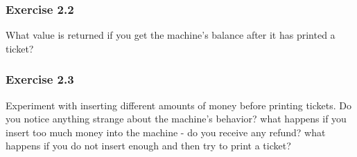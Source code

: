 \subsubsection{Exercise 2.2}
What value is returned if you get the machine's balance after it has printed a 
ticket? 

\subsubsection{Exercise 2.3}
Experiment with inserting different amounts of money before printing tickets. 
Do you notice anything strange about the machine's behavior? what happens if 
you insert too much money into the machine - do you receive any refund? what 
happens if you do not insert enough and then try to print a ticket? 
